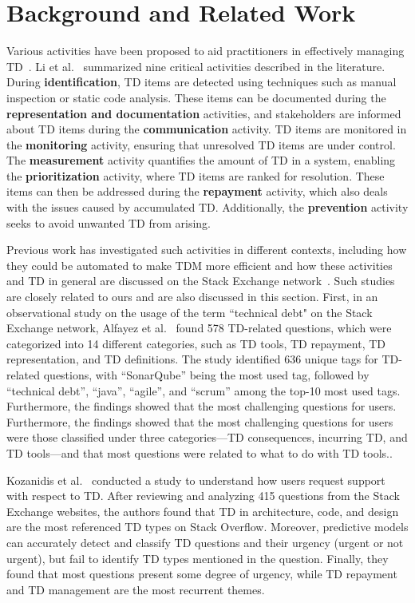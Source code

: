 \section{Background and Related Work}
\label{sec:rw}

Various activities have been proposed to aid practitioners in effectively managing TD~\cite{Alves2016, Guo2011, McGregor2012, Santos2013}. Li et al.~\cite{Li2015} summarized nine critical activities described in the literature. During \textbf{identification}, TD items are detected using techniques such as manual inspection or static code analysis. These items can be documented during the \textbf{representation and documentation} activities, and stakeholders are informed about TD items during the \textbf{communication} activity. TD items are monitored in the \textbf{monitoring} activity, ensuring that unresolved TD items are under control. The \textbf{measurement} activity quantifies the amount of TD in a system, enabling the \textbf{prioritization} activity, where TD items are ranked for resolution. These items can then be addressed during the \textbf{repayment} activity, which also deals with the issues caused by accumulated TD. Additionally, the \textbf{prevention} activity seeks to avoid unwanted TD from arising.

Previous work has investigated such activities in different contexts, including how they could be automated to make TDM more efficient and how these activities and TD in general are discussed on the Stack Exchange network~\cite{Alfayez2023,Kozanidis2022, Santos2022, Edbert2023, Peruma2021, Gama2020}. Such studies are closely related to ours and are also discussed in this section. First, in an observational study on the usage of the term ``technical debt" on the Stack Exchange network, Alfayez et al.~\cite{Alfayez2023} found 578 TD-related questions, which were categorized into 14 different categories, such as TD tools, TD repayment, TD representation, and TD definitions. The study identified 636 unique tags for TD-related questions, with ``SonarQube'' being the most used tag, followed by ``technical debt'', ``java'', ``agile'', and ``scrum'' among the top-10 most used tags. Furthermore, the findings showed that the most challenging questions for users. Furthermore, the findings showed that the most challenging questions for users were those classified under three categories---TD consequences, incurring TD, and TD tools---and that most questions were related to what to do with TD tools..

Kozanidis et al.~\cite{Kozanidis2022} conducted a study to understand how users request support with respect to TD. After reviewing and analyzing 415 questions from the Stack Exchange websites, the authors found that TD in architecture, code, and design are the most referenced TD types on Stack Overflow. Moreover, predictive models can accurately detect and classify TD questions and their urgency (urgent or not urgent), but fail to identify TD types mentioned in the question. Finally, they found that most questions present some degree of urgency, while TD repayment and TD management are the most recurrent themes.

